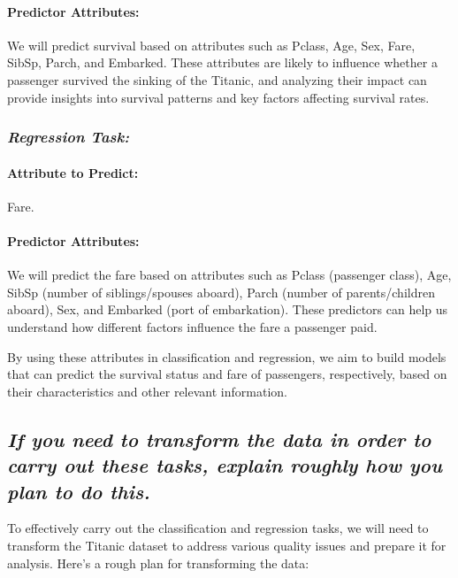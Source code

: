 \documentclass[twoside,11pt]{article}
\makeatletter
\let\@oldsubsection\subsection
\renewcommand\subsection[1]{\@oldsubsection*{\textit{#1}}}
\let\@oldsubsubsection\subsubsection
\renewcommand\subsubsection[1]{\@oldsubsubsection*{\textit{#1}}}
\makeatother
\begin{document}
\paragraph{Predictor Attributes:} We will predict survival based on attributes such as Pclass, Age, Sex, Fare, SibSp, Parch, and Embarked. These attributes are likely to influence whether a passenger survived the sinking of the Titanic, and analyzing their impact can provide insights into survival patterns and key factors affecting survival rates.

\subsubsection{Regression Task:}

\paragraph{Attribute to Predict:} Fare.

\paragraph{Predictor Attributes:} We will predict the fare based on attributes such as Pclass (passenger class), Age, SibSp (number of siblings/spouses aboard), Parch (number of parents/children aboard), Sex, and Embarked (port of embarkation). These predictors can help us understand how different factors influence the fare a passenger paid.

By using these attributes in classification and regression, we aim to build models that can predict the survival status and fare of passengers, respectively, based on their characteristics and other relevant information.

\subsection{If you need to transform the data in order to carry out these tasks, explain roughly how you plan to do this.}

To effectively carry out the classification and regression tasks, we will need to transform the Titanic dataset to address various quality issues and prepare it for analysis. Here’s a rough plan for transforming the data:
\end{document}
